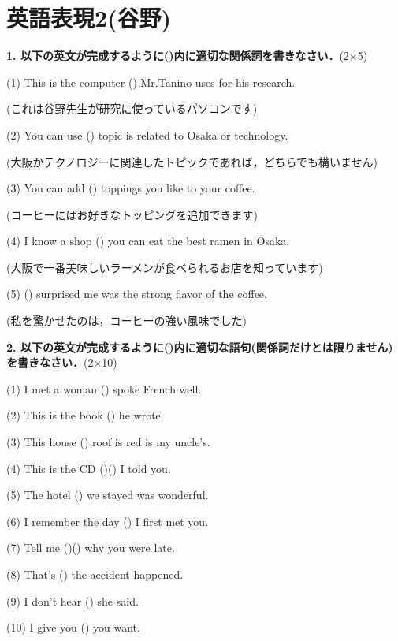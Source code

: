 \section{英語表現2(谷野)}
\noindent \textbf{1.  以下の英文が完成するように(\quad)内に適切な関係詞を書きなさい．}{\scriptsize(2$\times$5)}\par
(1) This is the computer (\quad\quad) Mr.Tanino uses for his research.\par\quad
  (これは谷野先生が研究に使っているパソコンです)\par
(2) You can use (\quad\quad) topic is related to Osaka or technology.\par\quad
  (大阪かテクノロジーに関連したトピックであれば，どちらでも構いません)\par
(3) You can add (\quad\quad) toppings you like to your coffee.\par\quad
  (コーヒーにはお好きなトッピングを追加できます)\par
(4) I know a shop (\quad\quad) you can eat the best ramen in Osaka.\par\quad
  (大阪で一番美味しいラーメンが食べられるお店を知っています)\par
(5) (\quad\quad) surprised me was the strong flavor of the coffee.\par\quad 
  (私を驚かせたのは，コーヒーの強い風味でした)\par
\bigskip

\noindent \textbf{2.  以下の英文が完成するように(\quad)内に適切な語句(関係詞だけとは限りません)を書きなさい．}{\scriptsize(2$\times$10)}\par
(1) I met a woman (\quad\quad) spoke French well.\par
(2) This is the book (\quad\quad) he wrote.\par
(3) This house (\quad\quad) roof is red is my uncle's.\par
(4) This is the CD (\quad\quad)(\quad\quad) I told you.\par
(5) The hotel (\quad\quad) we stayed was wonderful.\par
(6) I remember the day (\quad\quad) I first met you.\par
(7) Tell me (\quad\quad)(\quad\quad) why you were late.\par
(8) That's (\quad\quad) the accident happened.\par
(9) I don't hear (\quad\quad) she said.\par
(10) I give you (\quad\quad) you want.\par
\bigskip\bigskip

